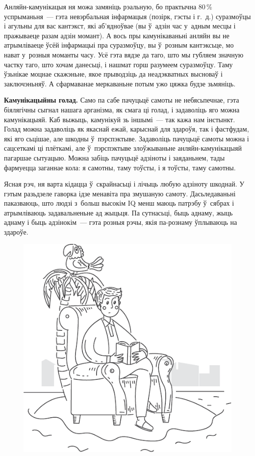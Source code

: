 Анляйн-камунікацыя ня можа замяніць рэальную, бо практычна 80\,\% успрыманьня~--- гэта невэрбальная інфармацыя (позірк, гэсты і г.~д.) суразмоўцы і агульны для вас кантэкст, які аб'ядноўвае (вы ў~адзін час у~адным месцы і пражываеце разам адзін момант). А вось пры камунікаваньні анляйн вы не атрымліваеце ўсёй інфармацыі пра суразмоўцу, вы ў~розным кантэксьце, мо нават у~розныя моманты часу. Усё гэта вядзе да таго, што мы губляем значную частку таго, што хочам данесьці, і нашмат горш разумеем суразмоўцу. Таму ўзьнікае моцнае скажэньне, якое прыводзіць да неадэкватных высноваў і заключэньняў. А сфармаванае меркаваньне потым ужо цяжка будзе зьмяніць.

\textbf{Камунікацыйны голад.} Само па сабе пачуцьцё самоты не небясьпечнае, гэта біялягічны сыгнал нашага арганізма, як смага ці голад, і задаволіць яго можна камунікацыяй. Каб выжыць, камунікуй зь іншымі~--- так кажа нам інстынкт. Голад можна задаволіць як якаснай ежай, карыснай для здароўя, так і фастфудам, які яго сьцішае, але шкодны ў~пэрспэктыве. Задаволіць пачуцьцё самоты можна і сацсеткамі ці плёткамі, але ў~пэрспэктыве злоўжываньне анляйн-камунікацыяй пагаршае сытуацыю. Можна забіць пачуцьцё адзіноты і заяданьнем, тады фармуецца заганнае кола: я самотны, таму тоўсты, і я тоўсты, таму самотны.

Ясная рэч, ня варта кідацца ў~скрайнасьці і лічыць любую адзіноту шкоднай. У гэтым разьдзеле гаворка ідзе менавіта пра змушаную самоту. Дасьледаваньні паказваюць, што людзі з~больш высокім IQ менш маюць патрэбу ў~сябрах і атрымліваюць задавальненьне ад жыцьця. Па сутнасьці, быць аднаму, жыць аднаму і быць адзінокім~--- гэта розныя рэчы, якія па-рознаму ўплываюць на здароўе.

\begin{figure}[htb!]
  \centering
  \includegraphics[scale=0.9]{willpower/ch10/4.pdf}
\end{figure}

